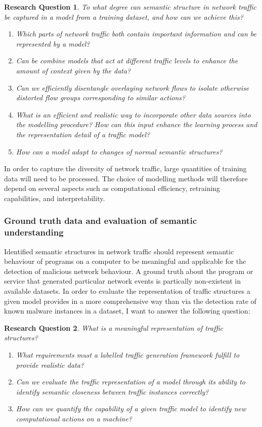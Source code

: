 \documentclass[a4paper,12pt,twoside]{report}
\newtheorem{rquestion}{Research Question}
\begin{document}
\begin{rquestion}
To what degree can semantic structure in network traffic be captured in a model from a training dataset, and how can we achieve this?
\begin{enumerate}
\item Which parts of network traffic both contain important information and can be represented by a model?
\item Can be combine models that act at different traffic levels to enhance the amount of context given by the data? 
\item Can we efficiently disentangle overlaying network flows to isolate otherwise distorted flow groups corresponding to similar actions? 
\item What is an efficient and realistic way to incorporate other data sources into the modelling procedure? How can this input enhance the learning process and the representation detail of a traffic model? 
\item How can a model adapt to changes of normal semantic structures?
\end{enumerate}
\end{rquestion}

In order to capture the diversity of network traffic, large quantities of training data will need to be processed. The choice of modelling methods will therefore depend on several aspects such as computational efficiency, retraining capabilities, and interpretability.

\subsubsection{Ground truth data and evaluation of semantic understanding}

Identified semantic structures in network traffic should represent semantic behaviour of programs on a computer to be meaningful and applicable for the detection of malicious network behaviour. A ground truth about the program or service that generated particular network events is partically non-existent in available datasets. In order to evaluate the representation of traffic structures a given model provides in a more comprehensive way than via the detection rate of known malware instances in a dataset, I want to answer the following question:

\begin{rquestion}
What is a meaningful representation of traffic structures?
\begin{enumerate}
\item What requirements must a labelled traffic generation framework fulfill to provide realistic data?
\item Can we evaluate the traffic representation of a model through its ability to identify semantic closeness between traffic instances correctly?
\item How can we quantify the capability of a given traffic model to identify new computational actions on a machine?
\end{enumerate}
\end{rquestion}
\end{document}
